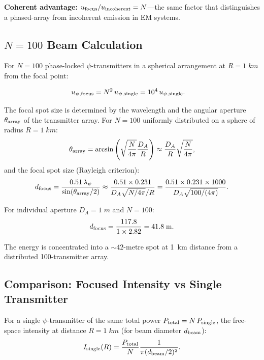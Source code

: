 \documentclass[aps,prd,twocolumn,superscriptaddress]{revtex4-2}
\begin{document}
\textbf{Coherent advantage:} $u_{\rm focus}/u_{\rm incoherent} = N$---the
same factor that distinguishes a phased-array from incoherent emission
in EM systems.

\subsection{$N = 100$ Beam Calculation}

For $N = 100$ phase-locked $\psi$-transmitters in a spherical arrangement
at $R = 1\;\si{km}$ from the focal point:

\begin{align}
u_{\psi,\rm focus} &= N^2\,u_{\psi,\rm single} = 10^4\,u_{\psi,\rm single}.
\end{align}

The focal spot size is determined by the wavelength and the angular
aperture $\theta_{\rm array}$ of the transmitter array.  For $N = 100$
uniformly distributed on a sphere of radius $R = 1\;\si{km}$:
\begin{equation}
\theta_{\rm array} = \arcsin\left(\sqrt{\frac{N}{4\pi}}\frac{D_A}{R}\right)
\approx \frac{D_A}{R}\sqrt{\frac{N}{4\pi}},
\end{equation}
and the focal spot size (Rayleigh criterion):
\begin{equation}
d_{\rm focus} = \frac{0.51\,\lambda_\psi}{\sin(\theta_{\rm array}/2)}
\approx \frac{0.51\times 0.231}{D_A\sqrt{N/4\pi}/R}
= \frac{0.51\times0.231\times1000}{D_A\sqrt{100/(4\pi)}}.
\label{eq:focal-spot}
\end{equation}

For individual aperture $D_A = 1\;\si{m}$ and $N = 100$:
\begin{equation}
d_{\rm focus} = \frac{117.8}{1\times 2.82} = 41.8\;\si{m}.
\end{equation}

The energy is concentrated into a $\sim 42$-metre spot at 1~km distance
from a distributed 100-transmitter array.

\subsection{Comparison: Focused Intensity vs Single Transmitter}

For a single $\psi$-transmitter of the same total power
$P_{\rm total} = N\,P_{\rm single}$, the free-space intensity at distance
$R = 1\;\si{km}$ (for beam diameter $d_{\rm beam}$):
\begin{equation}
I_{\rm single}(R) = \frac{P_{\rm total}}{N}\frac{1}{\pi(d_{\rm beam}/2)^2}.
\end{equation}
\end{document}
